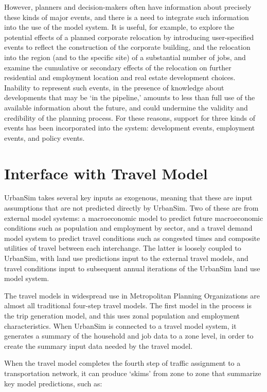 However, planners and decision-makers often have information about
precisely these kinds of major events, and there is a need to
integrate such information into the use of the model system.  It
is useful, for example, to explore the potential effects of a
planned corporate relocation by introducing user-specified events
to reflect the construction of the corporate building, and the
relocation into the region (and to the specific site) of a
substantial number of jobs, and examine the cumulative or
secondary effects of the relocation on further residential and
employment location and real estate development choices. Inability
to represent such events, in the presence of knowledge about
developments that may be `in the pipeline,' amounts to less than
full use of the available information about the future, and could
undermine the validity and credibility of the planning process.
For these reasons, support for three kinds of events has been
incorporated into the system: development events, employment
events, and policy events.


\section{Interface with Travel Model}

UrbanSim takes several key inputs as exogenous, meaning that these
are input assumptions that are not predicted directly by UrbanSim.  Two of these are
from external model systems: a macroeconomic model to predict
future macroeconomic conditions such as population and employment
by sector, and a travel demand model system to predict travel
conditions such as congested times and composite utilities of
travel between each interchange.  The latter is loosely coupled to
UrbanSim, with land use predictions input to the external travel
models, and travel conditions input to subsequent annual
iterations of the UrbanSim land use model system.

The travel models in widespread use in Metropolitan Planning Organizations are
almost all traditional four-step travel models.  The first model in the process
is the trip generation model, and this uses zonal population and employment
characteristics.  When UrbanSim is connected to a travel model system,
it generates a summary of the household and job data to a zone level, in order
to create the summary input data needed by the travel model.

When the travel model completes the fourth step of traffic assignment to a
transportation network, it can produce `skims' from zone to zone that summarize
key model predictions, such as:


